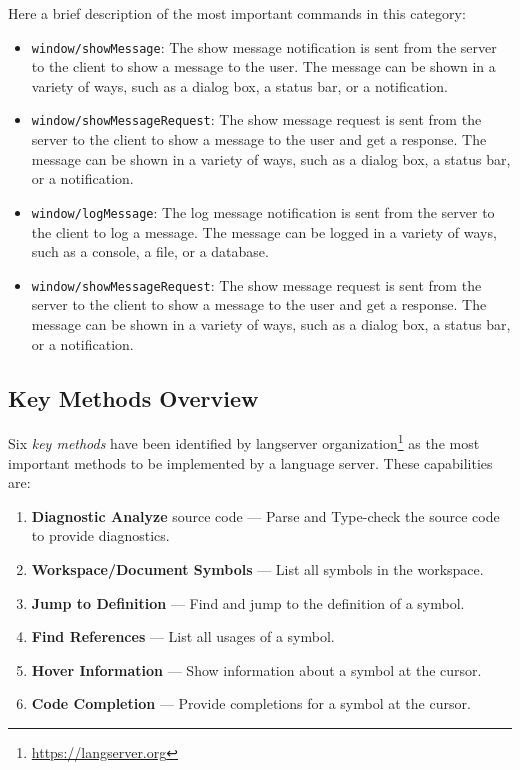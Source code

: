 Here a brief description of the most important commands in this category:
\begin{itemize}
    \item \texttt{window/showMessage}: The show message notification is sent from the server to the client to show a message to the user. The message can be shown in a variety of ways, such as a dialog box, a status bar, or a notification.
    \item \texttt{window/showMessageRequest}: The show message request is sent from the server to the client to show a message to the user and get a response. The message can be shown in a variety of ways, such as a dialog box, a status bar, or a notification.
    \item \texttt{window/logMessage}: The log message notification is sent from the server to the client to log a message. The message can be logged in a variety of ways, such as a console, a file, or a database.
    \item \texttt{window/showMessageRequest}: The show message request is sent from the server to the client to show a message to the user and get a response. The message can be shown in a variety of ways, such as a dialog box, a status bar, or a notification.
\end{itemize}

\subsection{Key Methods Overview}\label{subsec:bacground:KeyMethodsOverview}

Six \textit{key methods} have been identified by langserver organization\footnote{\url{https://langserver.org}} as the most important methods to be implemented by a language server. These capabilities are:
\begin{enumerate}
    \item \textbf{Diagnostic Analyze} source code --- Parse and Type-check the source code to provide diagnostics.
    \item \textbf{Workspace/Document Symbols} --- List all symbols in the workspace.
    \item \textbf{Jump to Definition} --- Find and jump to the definition of a symbol.
    \item \textbf{Find References} --- List all usages of a symbol.
    \item \textbf{Hover Information} --- Show information about a symbol at the cursor.
    \item \textbf{Code Completion} --- Provide completions for a symbol at the cursor.
\end{enumerate}

